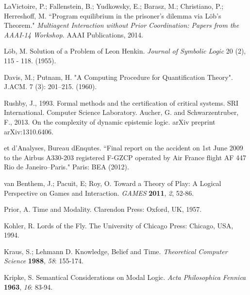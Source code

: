 \begin{thebibliography}{9}
	 	LaVictoire, P.; Fallenstein, B.; Yudkowsky, E.; Barasz, M.; Christiano, P.; Herreshoff, M. ``Program  equilibrium  in  the  prisoner’s  dilemma  via L\"ob’s Theorem." {\em Multiagent Interaction without Prior Coordination: Papers from the AAAI-14 Workshop.} AAAI Publications, 2014.
	 	
	 	L\"ob, M. Solution of a Problem of Leon Henkin. {\em Journal of Symbolic Logic} 20 (2), 115 - 118. (1955).
	 	
	 	Davis, M.; Putnam, H. "A Computing Procedure for Quantification Theory". J.ACM. 7 (3): 201–215. (1960).
	 	
	 	 Rushby, J., 1993. Formal methods and the certification of critical systems. SRI International. Computer Science Laboratory.
	 	 Aucher, G. and Schwarzentruber, F., 2013. On the complexity of dynamic epistemic logic. arXiv preprint arXiv:1310.6406.
	 	
	 	
	 	
	 	et d'Analyses, Bureau dEnqutes. ``Final report on the accident on 1st June 2009 to the Airbus A330-203 registered F-GZCP operated by Air France flight AF 447 Rio de Janeiro–Paris." Paris: BEA (2012).
	 	
	 	
	 	van Benthem, J.; Pacuit, E; Roy, O. Toward a Theory of Play: A Logical Perspective on Games and Interaction. {\em GAMES} {\bf 2011}, {\em 2}, 52-86.
	 	
	 	Prior, A. Time and Modality. Clarendon Press: Oxford, UK, 1957.
	 	
	 	Kohler, R. Lords of the Fly. The University of Chicago Press: Chicago, USA, 1994.
	 	
	 	Kraus, S.; Lehmann D. Knowledge, Belief and Time. {\em Theoretical Computer Science} {\bf 1988}, {\em 58}: 155-174.
	 	
	 	Kripke, S. Semantical Considerations on Modal Logic. {\em Acta Philosophica Fennica} {\bf 1963}, {\em 16}: 83-94.
	 	

\end{thebibliography}
